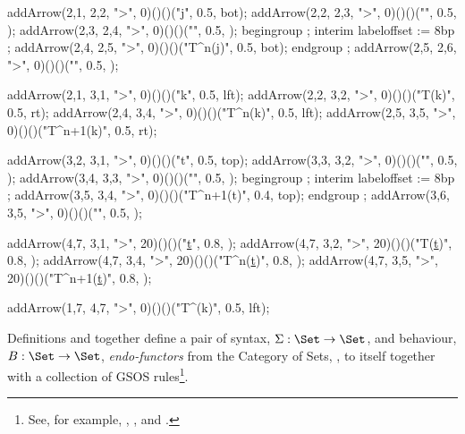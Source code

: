   addArrow(2,1, 2,2, ">", 0)()()("j",          0.5, bot);
  addArrow(2,2, 2,3, ">", 0)()()("",           0.5, );
  addArrow(2,3, 2,4, ">", 0)()()("",           0.5, );
  begingroup ;  interim labeloffset := 8bp ;
  addArrow(2,4, 2,5, ">", 0)()()("T^n(j)",     0.5, bot);
  endgroup ; 
  addArrow(2,5, 2,6, ">", 0)()()("",           0.5, );
  
  addArrow(2,1, 3,1, ">", 0)()()("k",          0.5, lft);
  addArrow(2,2, 3,2, ">", 0)()()("T(k)",       0.5, rt);
  addArrow(2,4, 3,4, ">", 0)()()("T^n(k)", 0.5, lft);
  addArrow(2,5, 3,5, ">", 0)()()("T^{n+1}(k)", 0.5, rt);

  addArrow(3,2, 3,1, ">", 0)()()("t",          0.5, top);
  addArrow(3,3, 3,2, ">", 0)()()("",           0.5, );
  addArrow(3,4, 3,3, ">", 0)()()("",           0.5, );
  begingroup ;  interim labeloffset := 8bp ;
  addArrow(3,5, 3,4, ">", 0)()()("T^{n+1}(t)", 0.4, top);
  endgroup ; 
  addArrow(3,6, 3,5, ">", 0)()()("",           0.5, );

  addArrow(4,7, 3,1, ">", 20)()()("\underline{t}",          0.8, );
  addArrow(4,7, 3,2, ">", 20)()()("T(\underline{t})",       0.8, );
  addArrow(4,7, 3,4, ">", 20)()()("T^n(\underline{t})",     0.8, );
  addArrow(4,7, 3,5, ">", 20)()()("T^{n+1}(\underline{t})", 0.8, );
  
  addArrow(1,7, 4,7, ">", 0)()()("T^{\infinity}(k)", 0.5, lft);

\stopMPcode \stopformula

\noindent {} 

\stopMMundi

\startMMundi


\stopMMundi

\startMMundi

Definitions \in[beastieActions] and \in[beastieTests] together define a 
pair of syntax, $\Sigma : \Set \rightarrow \Set$, and behaviour, $B : \Set 
\rightarrow \Set$, \emph{endo-functors} from the Category of Sets, \Set, 
to itself together with a collection of GSOS rules\footnote{See, for 
example, \cite{turiPlotkin1997operationalSemantics}, 
\cite{klin2011bialgebrasSOS}, and \cite{jacobs2017coalgebras}.}. 

